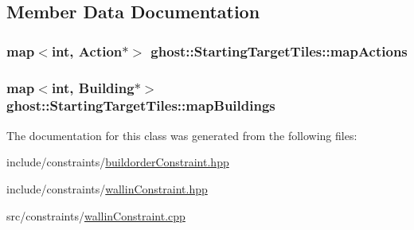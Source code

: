 \subsection{Member Data Documentation}
\hypertarget{classghost_1_1StartingTargetTiles_a09044317698eebe778e8c5eeb3e58ff2}{
\subsubsection[{map\-Actions}]{\setlength{\rightskip}{0pt plus 5cm}map$<$int, {\bf Action}$\ast$$>$ ghost\-::\-Starting\-Target\-Tiles\-::map\-Actions\hspace{0.3cm}{\ttfamily [private]}}}\label{classghost_1_1StartingTargetTiles_a09044317698eebe778e8c5eeb3e58ff2}
\hypertarget{classghost_1_1StartingTargetTiles_a08e51275da85bfaa8a108976cbd133e2}{
\subsubsection[{map\-Buildings}]{\setlength{\rightskip}{0pt plus 5cm}map$<$int, {\bf Building}$\ast$$>$ ghost\-::\-Starting\-Target\-Tiles\-::map\-Buildings\hspace{0.3cm}{\ttfamily [private]}}}\label{classghost_1_1StartingTargetTiles_a08e51275da85bfaa8a108976cbd133e2}


The documentation for this class was generated from the following files\-:\begin{DoxyCompactItemize}
\item 
include/constraints/\hyperlink{buildorderConstraint_8hpp}{buildorder\-Constraint.\-hpp}\item 
include/constraints/\hyperlink{wallinConstraint_8hpp}{wallin\-Constraint.\-hpp}\item 
src/constraints/\hyperlink{wallinConstraint_8cpp}{wallin\-Constraint.\-cpp}\end{DoxyCompactItemize}
